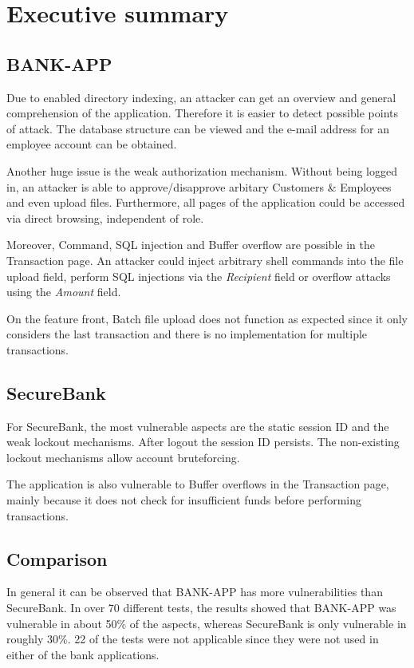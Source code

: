 \chapter{Executive summary}
\section*{BANK-APP}
Due to enabled directory indexing, an attacker can get an overview and general comprehension of the application. Therefore it is easier to detect possible points of attack. The database structure can be viewed and the e-mail address for an employee account can be obtained.

Another huge issue is the weak authorization mechanism. Without being logged in, an attacker is able to approve/disapprove arbitary Customers \& Employees and even upload files. Furthermore, all pages of the application could be accessed via direct browsing, independent of role.

Moreover, Command, SQL injection and Buffer overflow are possible in the Transaction page. An attacker could inject arbitrary shell commands into the file upload field, perform SQL injections via the \emph{Recipient} field or overflow attacks using the \emph{Amount} field.

On the feature front, Batch file upload does not function as expected since it only considers the last transaction and there is no implementation for multiple transactions.

\section*{SecureBank}
For SecureBank, the most vulnerable aspects are the static session ID and the weak lockout mechanisms. After logout the session ID persists. The non-existing lockout mechanisms allow account bruteforcing.

The application is also vulnerable to Buffer overflows in the Transaction page, mainly because it does not check for insufficient funds before performing transactions.

\section*{Comparison}
In general it can be observed that BANK-APP has more vulnerabilities than SecureBank. In over 70 different tests, the results showed that BANK-APP was vulnerable in about 50\% of the aspects, whereas SecureBank is only vulnerable in roughly 30\%. 22 of the tests were not applicable since they were not used in either of the bank applications.